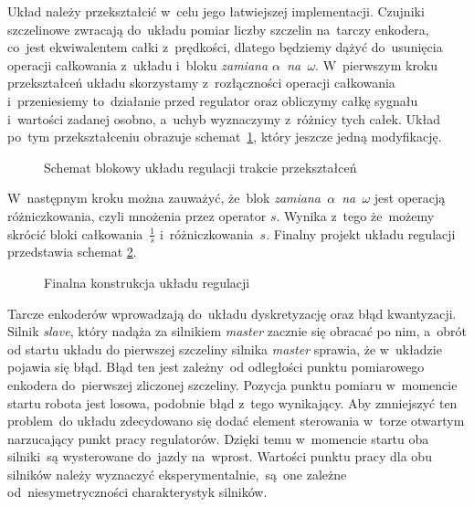 \documentclass[11pt]{article}
\begin{document}
Układ należy przekształcić w~celu jego łatwiejszej implementacji.
Czujniki szczelinowe zwracają do~układu pomiar liczby szczelin na~tarczy enkodera, co~jest ekwiwalentem całki z~prędkości, dlatego będziemy dążyć do~usunięcia operacji całkowania z~układu i~bloku \textit{zamiana $ \alpha $~na~$ \omega  $}.
W~pierwszym kroku przekształceń układu skorzystamy z~rozłączności operacji całkowania i~przeniesiemy to~działanie przed regulator oraz obliczymy całkę sygnału i~wartości zadanej osobno, a~uchyb wyznaczymy z~różnicy tych całek.
Układ po~tym przekształceniu obrazuje schemat~\ref{fig:tikz:control_block_2}, który jeszcze jedną modyfikację.
\begin{figure}[htbp]
	\centering
	
	\caption{Schemat blokowy układu regulacji trakcie przekształceń}
	\label{fig:tikz:control_block_2}
\end{figure}
W~następnym kroku można zauważyć, że~blok \textit{zamiana~$ \alpha $~na~$ \omega $} jest operacją różniczkowania, czyli mnożenia przez operator $ s $. Wynika z~tego że~możemy skrócić bloki całkowania~$ \frac{1}{s} $ i~różniczkowania~$ s $.
Finalny projekt układu regulacji przedstawia schemat \ref{fig:tikz:control_block_3}.
\begin{figure}
	\centering
	
	\caption{Finalna konstrukcja układu regulacji}
	\label{fig:tikz:control_block_3}
\end{figure}
Tarcze enkoderów wprowadzają do~układu dyskretyzację oraz błąd kwantyzacji.
Silnik \textit{slave}, który nadąża za silnikiem \textit{master} zacznie się obracać po nim, a~obrót od startu układu do pierwszej szczeliny silnika \textit{master} sprawia, że w~układzie pojawia się błąd.
Błąd ten jest zależny~od odległości punktu pomiarowego enkodera do~pierwszej zliczonej szczeliny.
Pozycja punktu pomiaru w~momencie startu robota jest losowa, podobnie błąd z~tego wynikający.
Aby zmniejszyć ten problem~do układu zdecydowano się dodać element sterowania w~torze otwartym narzucający punkt pracy regulatorów.
Dzięki temu w~momencie startu oba silniki~są wysterowane do~jazdy na~wprost.
Wartości punktu pracy dla obu silników należy wyznaczyć eksperymentalnie,~są~one zależne od~niesymetryczności charakterystyk silników.
\end{document}
